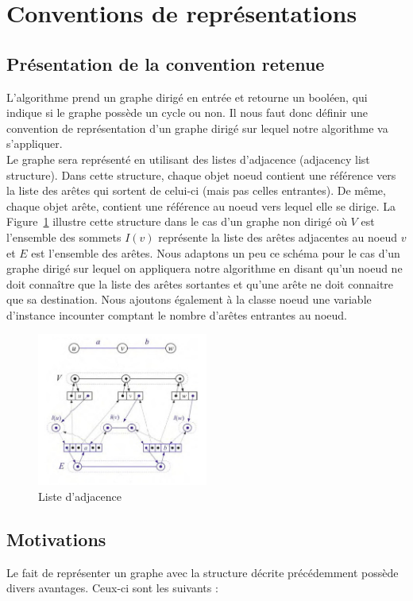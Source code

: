 \section{Conventions de représentations}

\subsection{Présentation de la convention retenue}
L'algorithme prend un graphe dirigé en entrée et retourne un booléen, qui indique si le graphe possède un cycle ou non. Il nous faut donc définir une convention de représentation d'un graphe dirigé sur lequel notre algorithme va s'appliquer. \\

Le graphe sera représenté en utilisant des listes d'adjacence (adjacency list structure). Dans cette structure, chaque objet noeud contient une référence vers la liste des arêtes qui sortent de celui-ci (mais pas celles entrantes). De même, chaque objet arête, contient une référence au noeud vers lequel elle se dirige. La Figure~\ref{adj} illustre cette structure dans le cas d'un graphe non dirigé où $V$ est l'ensemble des sommets $I(v)$ représente la liste des arêtes adjacentes au noeud $v$ et $E$ est l'ensemble des arêtes. Nous adaptons un peu ce schéma pour le cas d'un graphe dirigé sur lequel on appliquera notre algorithme en disant qu'un noeud ne doit connaître que la liste des arêtes sortantes et qu'une arête ne doit connaitre que sa destination. Nous ajoutons également à la classe noeud une variable d'instance incounter comptant le nombre d'arêtes entrantes au noeud. 

\begin{figure}[!h]
	\centering
         \includegraphics[width=0.5\textwidth]{1convderepr/schema.jpg}
         \caption{Liste d'adjacence}
          \label{adj}
\end{figure}

\subsection{Motivations}
Le fait de représenter un graphe avec la structure décrite précédemment possède divers avantages. Ceux-ci sont les suivants : \\

